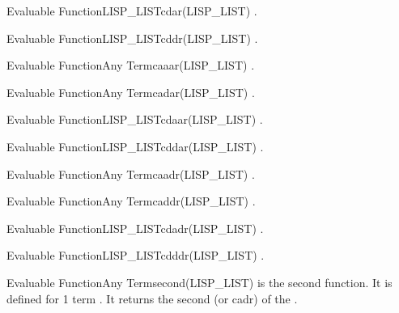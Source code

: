 \begin{typeefa}{Evaluable Function}{LISP\_LIST}{cdar}{(LISP\_LIST)}
.
\end{typeefa}

\begin{typeefa}{Evaluable Function}{LISP\_LIST}{cddr}{(LISP\_LIST)}
.
\end{typeefa}

\begin{typeefa}{Evaluable Function}{Any Term}{caaar}{(LISP\_LIST)}
.
\end{typeefa}

\begin{typeefa}{Evaluable Function}{Any Term}{cadar}{(LISP\_LIST)}
.
\end{typeefa}

\begin{typeefa}{Evaluable Function}{LISP\_LIST}{cdaar}{(LISP\_LIST)}
.
\end{typeefa}

\begin{typeefa}{Evaluable Function}{LISP\_LIST}{cddar}{(LISP\_LIST)}
.
\end{typeefa}

\begin{typeefa}{Evaluable Function}{Any Term}{caadr}{(LISP\_LIST)}
.
\end{typeefa}

\begin{typeefa}{Evaluable Function}{Any Term}{caddr}{(LISP\_LIST)}
.
\end{typeefa}

\begin{typeefa}{Evaluable Function}{LISP\_LIST}{cdadr}{(LISP\_LIST)}
.
\end{typeefa}

\begin{typeefa}{Evaluable Function}{LISP\_LIST}{cdddr}{(LISP\_LIST)}
.
\end{typeefa}

\begin{typeefa}{Evaluable Function}{Any Term}{second}{(LISP\_LIST)}
is the second function. It is defined for 1 term . It returns
the second (or cadr)  of the .
\end{typeefa}

